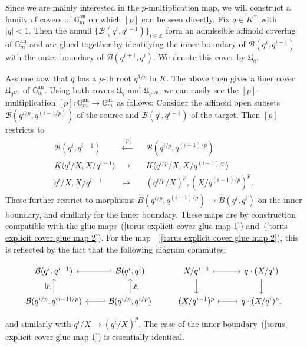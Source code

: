 \documentclass[10pt,oneside]{amsart}
\theoremstyle{definition}
\begin{document}
	Since we are mainly interested in the $p$-multiplication map, we will construct a family of covers of $\mathbb G_m^{\operatorname{an}}$ on which $[p]$ can be seen directly. Fix $q \in K^\times$ with $|q|< 1$. Then the annuli $\{\mathcal B(q^i,q^{i-1})\}_{i\in\mathbb{Z}}$ form an admissible affinoid covering of $\mathbb G_m^{\operatorname{an}}$ and are glued together by identifying the inner boundary of $\mathcal B(q^i, q^{i-1})$ with the outer boundary of $\mathcal B(q^{i+1},q^i)$. We denote this cover by $\mathfrak U_q$. 

	Assume now that $q$ has a $p$-th root $q^{1/p}$ in $K$. The above then gives a finer cover $\mathfrak U_{q^{1/p}}$ of $\mathbb G_m^{\operatorname{an}}$. Using both covers $\mathfrak U_q$ and $\mathfrak U_{q^{1/p}}$, we can easily see the $[p]$-multiplication $[p]:\mathbb G_m^{\operatorname{an}}\rightarrow \mathbb G_m^{\operatorname{an}}$ as follows: Consider the affinoid open subsets $\mathcal B(q^{i/p},q^{(i-1/p)})$ of the source and  $\mathcal B(q^i,q^{i-1})$ of the target. Then $[p]$ restricts to
	\begin{equation}
	\begin{alignedat}{2} \label{torus explicit [p] map 1}
	\mathcal B(q^i,q^{i-1})&\xleftarrow{[p]}&& \mathcal B(q^{i/p},q^{(i-1)/p})\\
	K\langle q^i/X,X/q^{i-1}\rangle&\rightarrow &&K\langle q^{i/p}/X, X/q^{(i-1)/p}\rangle\\
	q^i/X, X/q^{i-1}&\mapsto&& (q^{i/p}/X)^p, (X/q^{(i-1)/p})^p.
	\end{alignedat}
	\end{equation}
	These further restrict to morphisms $B(q^{i/p},q^{(i-1)/p})\rightarrow B(q^i,q^{i})$ on the inner boundary, and similarly for the inner boundary.
	These maps are by construction compatible with the glue maps~(\ref{torus explicit cover glue map 1}) and~(\ref{torus explicit cover glue map 2}). For the map ~(\ref{torus explicit cover glue map 2}), this is reflected by the fact that the following diagram commutes:
	\begin{center}
		\begin{equation}\label{diagram showing that [p]-multiplication on torus glues together}
		\begin{tikzcd}
			\mathcal B(q^i,q^{i-1}) & \mathcal B(q^i,q^i) \arrow[l, hook'] & X/q^{i-1} \arrow[r, maps to] \arrow[d, maps to] & q\cdot (X/q^{i})\arrow[d, maps to] \\
			\mathcal B(q^{i/p},q^{(i-1)/p}) \arrow[u, "{[p]}"] & \mathcal B(q^{i/p},q^{i/p}) \arrow[u, "{[p]}"'] \arrow[l, hook'] & (X/q^{i-1})^p \arrow[r, maps to] & q\cdot (X/q^{i})^p,
		\end{tikzcd}
		\end{equation}
	\end{center} 
	and similarly with $q^i/X\mapsto (q^i/X)^p$. The case of the inner boundary~(\ref{torus explicit cover glue map 1}) is essentially identical.
	
\end{document}
